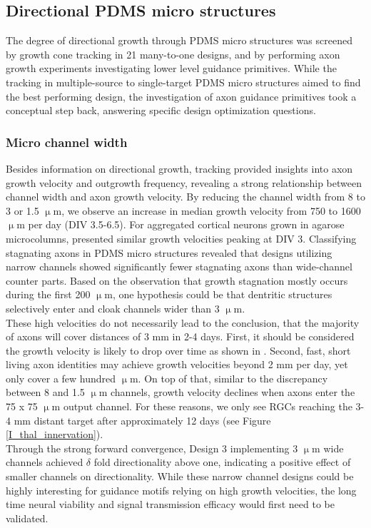 \subsection{Directional PDMS micro structures}
The degree of directional growth through PDMS micro structures was screened by
growth cone tracking in 21 many-to-one designs, and by performing axon growth
experiments investigating lower level guidance primitives. While the tracking in
multiple-source to single-target PDMS micro structures aimed to find the best
performing design, the investigation of axon guidance primitives took a
conceptual step back, answering specific design optimization questions. \\

\subsubsection{Micro channel width}
Besides information on directional growth, tracking provided insights into axon
growth velocity and outgrowth frequency, revealing a strong relationship between
channel width and axon growth velocity. By reducing the channel width from 8 to
3 or 1.5 $\upmu$m, we observe an increase in median growth velocity from 750 to
1600 $\upmu$m per day (DIV 3.5-6.5). For aggregated cortical neurons grown in
agarose microcolumns, \cite{cullenrecent} presented similar growth velocities
peaking at DIV 3. Classifying stagnating axons in PDMS micro structures revealed
that designs utilizing narrow channels showed significantly fewer stagnating
axons than wide-channel counter parts. Based on the observation that growth
stagnation mostly occurs during the first 200 $\upmu$m, one hypothesis could be
that dentritic structures selectively enter and cloak channels wider than 3
$\upmu$m. \\
These high velocities do not necessarily lead to the conclusion, that the
majority of axons will cover distances of 3 mm in 2-4 days. First, it should be
considered the growth velocity is likely to drop over time as shown in
\cite{cullenrecent}. Second, fast, short living axon identities may achieve
growth velocities beyond 2 mm per day, yet only cover a few hundred $\upmu$m. On
top of that, similar to the discrepancy between 8 and 1.5 $\upmu$m channels,
growth velocity declines when axons enter the 75 x 75 $\upmu$m output channel.
For these reasons, we only see RGCs reaching the 3-4 mm distant target after
approximately 12 days (see Figure \ref{I_thal_innervation}). \\
Through the strong forward convergence, Design 3 implementing 3 $\upmu$m wide
channels achieved $\delta$ fold directionality above one, indicating a positive
effect of smaller channels on directionality. While these narrow channel designs
could be highly interesting for guidance motifs relying on high growth
velocities, the long time neural viability and signal transmission efficacy
would first need to be validated. \\

